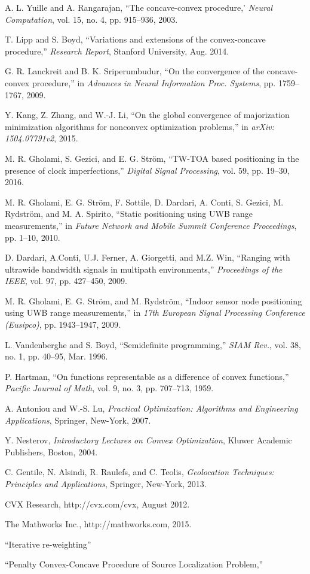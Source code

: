 \begin{thebibliography}{99}
A. L. Yuille and A. Rangarajan, ``The concave-convex procedure,' {\em Neural Computation}, vol. 15, no. 4, pp. 915--936, 2003.

T. Lipp and S. Boyd, ``Variations and extensions of the convex-concave procedure,'' {\em Research Report}, Stanford University, Aug. 2014.

G. R. Lanckreit and B. K. Sriperumbudur, ``On the convergence of the concave-convex procedure,'' in  {\em Advances in Neural Information Proc. Systems}, pp. 1759--1767, 2009.

Y. Kang, Z. Zhang, and W.-J. Li, ``On the global convergence of majorization minimization algorithms for nonconvex optimization problems,'' in {\em arXiv:
1504.07791v2}, 2015.

M. R. Gholami, S. Gezici, and E. G. Str\"om, ``TW-TOA based positioning in the presence of clock imperfections,'' {\em  Digital Signal Processing}, vol. 59, pp. 19--30, 2016.

M. R. Gholami, E. G. Str\"om, F. Sottile, D. Dardari, A. Conti, S. Gezici, M. Rydstr\"om, and M. A. Spirito, ``Static positioning using UWB range measurements,'' in {\em Future Network and Mobile Summit Conference Proceedings}, %
pp. 1--10, 2010.

D. Dardari, A.Conti, U.J. Ferner, A. Giorgetti, and M.Z. Win, ``Ranging with ultrawide bandwidth signals in multipath environments,'' {\em Proceedings of the IEEE}, vol. 97, pp. 427--450, 2009.

M. R. Gholami, E. G. Str\"om, and M. Rydstr\"om, ``Indoor sensor node positioning using UWB range measurements,'' in {\em 17th European Signal Processing Conference (Eusipco)}, pp. 1943--1947, 2009.

L. Vandenberghe and S. Boyd, ``Semidefinite programming,'' {\em SIAM Rev.}, vol. 38, no. 1, pp. 40--95, Mar. 1996.

P. Hartman, ``On functions representable as a difference of convex functions,'' {\em Pacific Journal of Math}, vol. 9, no. 3, pp. 707--713, 1959.

A. Antoniou and W.-S. Lu, {\em Practical Optimization: Algorithms and Engineering Applications}, Springer, New-York, 2007.

Y. Nesterov, {\em Introductory Lectures on Convex Optimization}, Kluwer Academic Publishers, Boston, 2004.

C. Gentile, N. Alsindi, R. Raulefs, and C. Teolis, {\em Geolocation Techniques: Principles and Applications}, Springer, New-York, 2013.

CVX Research, http://cvx.com/cvx, August 2012.

The Mathworks Inc., http://mathworks.com, 2015.

``Iterative re-weighting''

``Penalty Convex-Concave Procedure of Source Localization Problem,''

\end{thebibliography}